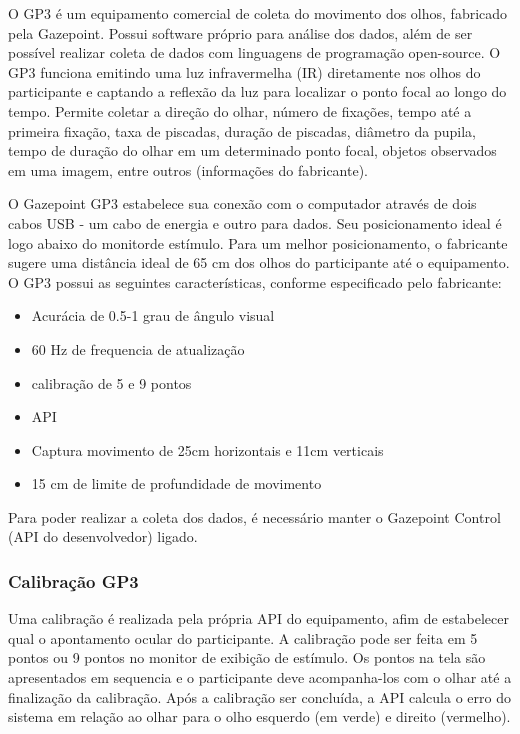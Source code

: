 O GP3 é um equipamento comercial de coleta do movimento dos olhos, 
fabricado pela Gazepoint. Possui software próprio para análise dos dados, 
além de ser possível realizar coleta de dados com linguagens de programação open-source. O GP3 funciona emitindo uma luz infravermelha (IR) 
diretamente nos olhos do participante e captando a reflexão da luz para localizar o ponto focal ao longo do tempo. 
Permite coletar a direção do olhar, número de fixações, tempo até a primeira fixação, taxa de piscadas,
 duração de piscadas, diâmetro da pupila, tempo de duração do olhar em um determinado ponto focal, 
 objetos observados em uma imagem, entre outros (informações do fabricante).

O Gazepoint GP3 estabelece sua conexão com o computador através de dois cabos USB - um cabo de energia e outro para dados.
Seu posicionamento ideal é logo abaixo do monitorde estímulo. Para um melhor posicionamento, o fabricante 
sugere uma distância ideal de 65 cm dos olhos do participante até o equipamento. O GP3 possui as seguintes características, conforme
especificado pelo fabricante:

\begin{itemize}
    \item Acurácia de 0.5-1 grau de ângulo visual
    \item 60 Hz de frequencia de atualização
    \item calibração de 5 e 9 pontos
    \item API
    \item Captura movimento de 25cm horizontais e 11cm verticais
    \item 15 cm de limite de profundidade de movimento
\end{itemize}

Para poder realizar a coleta dos dados, é necessário manter o Gazepoint Control (API do desenvolvedor) ligado. 

\subsubsection{Calibração GP3}
Uma calibração é realizada pela própria API do equipamento, afim de estabelecer qual o apontamento ocular do participante. 
A calibração pode ser feita em 5 pontos ou 9 pontos no monitor de exibição de estímulo. Os pontos na tela são apresentados
em sequencia e o participante deve acompanha-los com o olhar até a finalização da calibração. Após a calibração ser concluída, a API calcula o erro do sistema em relação ao olhar para o olho esquerdo (em verde) 
e direito (vermelho). 

